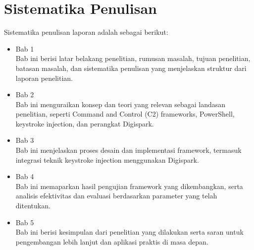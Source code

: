 \section{Sistematika Penulisan}
Sistematika penulisan laporan adalah sebagai berikut:
\begin{itemize}
	\item Bab 1 \babSatu \\
    Bab ini berisi latar belakang penelitian, rumusan masalah, tujuan penelitian, batasan masalah, dan sistematika penulisan yang menjelaskan struktur dari laporan penelitian.
    
	\item Bab 2 \babDua \\
    Bab ini menguraikan konsep dan teori yang relevan sebagai landasan penelitian, seperti Command and Control (C2) frameworks, PowerShell, keystroke injection, dan perangkat Digispark.

	\item Bab 3 \babTiga \\
    Bab ini menjelaskan proses desain dan implementasi framework, termasuk integrasi teknik keystroke injection menggunakan Digispark.
    
	\item Bab 4 \babEmpat \\
    Bab ini memaparkan hasil pengujian framework yang dikembangkan, serta analisis efektivitas dan evaluasi berdasarkan parameter yang telah ditentukan.
    
	\item Bab 5 \babLima \\
    Bab ini berisi kesimpulan dari penelitian yang dilakukan serta saran untuk pengembangan lebih lanjut dan aplikasi praktis di masa depan.

\end{itemize}


